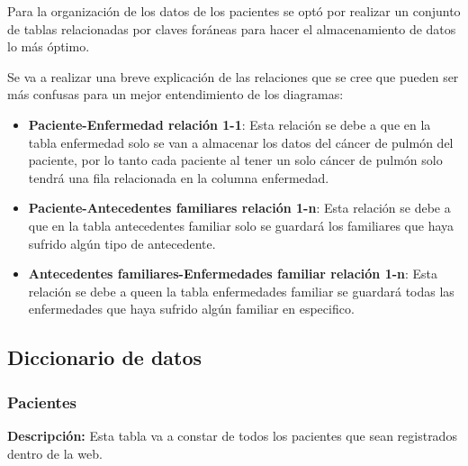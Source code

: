 Para la organización de los datos de los pacientes se optó por realizar un conjunto de tablas relacionadas por claves foráneas para hacer el almacenamiento de datos lo más óptimo.

Se va a realizar una breve explicación de las relaciones que se cree que pueden ser más confusas para un mejor entendimiento de los diagramas:
\begin{itemize}
    \item \textbf{Paciente-Enfermedad relación 1-1}: Esta relación se debe a que en la tabla enfermedad solo se van a almacenar los datos del cáncer de pulmón del paciente, por lo tanto cada paciente al tener un solo cáncer de pulmón solo tendrá una fila relacionada en la columna enfermedad.
    \item \textbf{Paciente-Antecedentes familiares relación 1-n}: Esta relación se debe a que en la tabla antecedentes familiar solo se guardará los familiares que haya sufrido algún tipo de antecedente.
    \item \textbf{Antecedentes familiares-Enfermedades familiar relación 1-n}: Esta relación se debe a queen la tabla enfermedades familiar se guardará todas las enfermedades que haya sufrido algún familiar en especifico.
\end{itemize}


\subsection{Diccionario de datos}

\subsubsection{Pacientes}

\textbf{Descripción:} Esta tabla va a constar de todos los pacientes que sean registrados dentro de la web.


